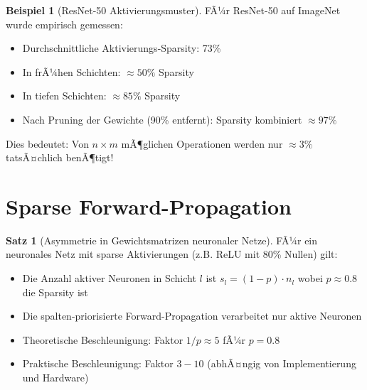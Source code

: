 ﻿\documentclass[a4paper,12pt]{report}
\theoremstyle{definition}
\newtheorem{beispiel}{Beispiel}
\newtheorem{satz}{Satz}
\begin{document}
	\begin{beispiel}[ResNet-50 Aktivierungsmuster]
		FÃ¼r ResNet-50 auf ImageNet wurde empirisch gemessen:
		\begin{itemize}
			\item Durchschnittliche Aktivierungs-Sparsity: 73\%
			\item In frÃ¼hen Schichten: $\approx 50\%$ Sparsity
			\item In tiefen Schichten: $\approx 85\%$ Sparsity
			\item Nach Pruning der Gewichte (90\% entfernt): Sparsity kombiniert $\approx 97\%$
		\end{itemize}
		
		Dies bedeutet: Von $n \times m$ mÃ¶glichen Operationen werden nur $\approx 3\%$ tatsÃ¤chlich benÃ¶tigt!
	\end{beispiel}
	
	\section{Sparse Forward-Propagation}
	
	\begin{satz}[Asymmetrie in Gewichtsmatrizen neuronaler Netze]
		FÃ¼r ein neuronales Netz mit sparse Aktivierungen (z.B. ReLU mit 80\% Nullen) gilt:
		\begin{itemize}
			\item Die Anzahl aktiver Neuronen in Schicht $l$ ist $s_l = (1-p) \cdot n_l$ wobei $p \approx 0.8$ die Sparsity ist
			\item Die spalten-priorisierte Forward-Propagation verarbeitet nur aktive Neuronen
			\item Theoretische Beschleunigung: Faktor $1/p \approx 5$ fÃ¼r $p = 0.8$
			\item Praktische Beschleunigung: Faktor $3-10$ (abhÃ¤ngig von Implementierung und Hardware)
		\end{itemize}
	\end{satz}
	
\end{document}
